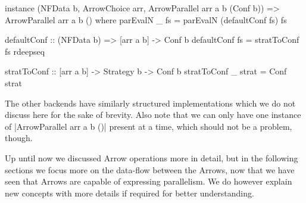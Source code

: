 \begin{code}
instance (NFData b, ArrowChoice arr, ArrowParallel arr a b (Conf b)) =>
  ArrowParallel arr a b () where
    parEvalN _ fs = parEvalN (defaultConf fs) fs

defaultConf :: (NFData b) => [arr a b] -> Conf b
defaultConf fs = stratToConf fs rdeepseq

stratToConf :: [arr a b] -> Strategy b -> Conf b
stratToConf _ strat = Conf strat
\end{code}

The other backends have similarly structured implementations which we do not discuss here for the sake of brevity. Also note that we can only have one instance of |ArrowParallel arr a b ()| present at a time, which should not be a problem, though.

Up until now we discussed Arrow operations more in detail, but in the following sections we focus more on the data-flow between the Arrows, now that we have seen that Arrows are capable of expressing parallelism. We do however explain new concepts with more details if required for better understanding.